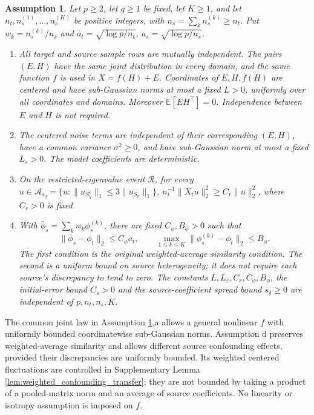 \documentclass[12pt]{article}
\newtheorem{assump}{Assumption}
\begin{document}
\begin{assump}
\label{assum:distribution_E_H_f}
Let $p\ge2$, let $q\ge1$ be fixed, let $K\ge1$, and let
$n_t,n_s^{(1)},\ldots,n_s^{(K)}$ be positive integers, with
$n_s=\sum_k n_s^{(k)}\ge n_t$. Put $w_k=n_s^{(k)}/n_s$ and
$a_t=\sqrt{\log p/n_t}$, $a_s=\sqrt{\log p/n_s}$.
\begin{enumerate}
\item[a.] All target and source sample rows are mutually independent. The
pairs $(E,H)$ have the same joint distribution in every domain, and the same
function $f$ is used in $X=f(H)+E$. Coordinates of $E,H,f(H)$ are centered
and have sub-Gaussian norms at most a fixed $L>0$, uniformly over all
coordinates and domains. Moreover $\mathbb E[EH^\top]=0$. Independence
between $E$ and $H$ is not required.
\item[b.] The centered noise terms are independent of their corresponding
$(E,H)$, have a common variance $\sigma^2\ge0$, and have sub-Gaussian norm
at most a fixed $L_\varepsilon>0$. The model coefficients are deterministic.
\item[c.] On the restricted-eigenvalue event $\mathcal R$, for every
$u\in\mathcal A_{s_\eta}
=\{u: \|u_{S_\eta^c}\|_1\le3\|u_{S_\eta}\|_1\}$,
$n_t^{-1}\|X_tu\|_2^2\ge C_r\|u\|_2^2$, where $C_r>0$ is fixed.
\item[d.] With $\bar\phi_s=\sum_k w_k\phi_s^{(k)}$, there are fixed
$C_\phi,B_\phi>0$ such that
\[
 \|\bar\phi_s-\phi_t\|_2\le C_\phi a_t,
 \qquad \max_{1\le k\le K}\|\phi_s^{(k)}-\phi_t\|_2\le B_\phi.
\]
The first condition is the original weighted-average similarity condition.
The second is a uniform bound on source heterogeneity; it does not require
each source's discrepancy to tend to zero. The constants $L,L_\varepsilon,
C_r,C_\phi,B_\phi$, the initial-error bound $C_s>0$ and the source-coefficient
spread bound $s_\delta\ge0$ are independent of $p,n_t,n_s,K$.
\end{enumerate}
\end{assump}

The common joint law in Assumption \ref{assum:distribution_E_H_f}.a
allows a general nonlinear $f$ with uniformly bounded coordinatewise
sub-Gaussian norms. Assumption d preserves weighted-average similarity and
allows different source confounding effects, provided their discrepancies
are uniformly bounded. Its weighted centered fluctuations are controlled
in Supplementary Lemma \ref{lem:weighted_confounding_transfer}; they are
not bounded by taking a product of a pooled-matrix norm and an average of
source coefficients. No linearity or isotropy assumption is imposed on $f$.
\end{document}
